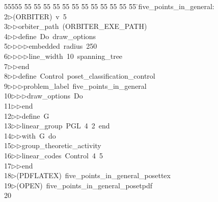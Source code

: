 %
%
\begin{tabbing}
55555 \= 55 \= 55 \= 55 \= 55 \= 55 \= 55 \= 55 \= 55 \= 55 \= 55 \= 55 \= 55 \= \>five\_points\_in\_general:\\[0pt]
2\>$\triangleright$\>(ORBITER)\ v\ 5\ \\[0pt]
3\>$\triangleright$\>$\triangleright$\>orbiter\_path\ (ORBITER\_EXE\_PATH)\ \\[0pt]
4\>$\triangleright$\>$\triangleright$\>define\ Do\ draw\_options\ \\[0pt]
5\>$\triangleright$\>$\triangleright$\>$\triangleright$\>$\triangleright$\>embedded\ radius\ 250\ \\[0pt]
6\>$\triangleright$\>$\triangleright$\>$\triangleright$\>$\triangleright$\>line\_width\ 10\ spanning\_tree\ \\[0pt]
7\>$\triangleright$\>$\triangleright$\>end\ \\[0pt]
8\>$\triangleright$\>$\triangleright$\>define\ Control\ poset\_classification\_control\ \\[0pt]
9\>$\triangleright$\>$\triangleright$\>$\triangleright$\>problem\_label\ five\_points\_in\_general\ \\[0pt]
10\>$\triangleright$\>$\triangleright$\>$\triangleright$\>draw\_options\ Do\ \\[0pt]
11\>$\triangleright$\>$\triangleright$\>end\ \\[0pt]
12\>$\triangleright$\>$\triangleright$\>define\ G\ \\[0pt]
13\>$\triangleright$\>$\triangleright$\>linear\_group\ PGL\ 4\ 2\ end\ \\[0pt]
14\>$\triangleright$\>$\triangleright$\>with\ G\ do\ \\[0pt]
15\>$\triangleright$\>$\triangleright$\>group\_theoretic\_activity\ \\[0pt]
16\>$\triangleright$\>$\triangleright$\>linear\_codes\ Control\ 4\ 5\ \\[0pt]
17\>$\triangleright$\>$\triangleright$\>end\\[0pt]
18\>$\triangleright$\>(PDFLATEX)\ five\_points\_in\_general\_posettex\\[0pt]
19\>$\triangleright$\>(OPEN)\ five\_points\_in\_general\_posetpdf\\[0pt]
20\>\end{tabbing}

